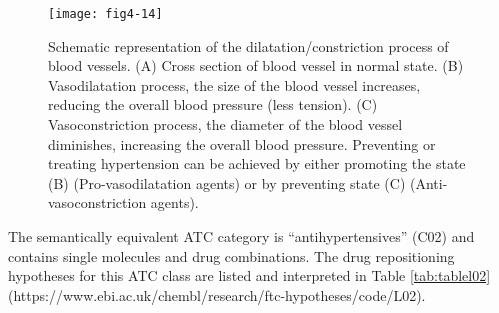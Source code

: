 \begin{figure}[ht]
    \centering
    \texttt{[image: fig4-14]}
    \caption{Schematic representation of the dilatation/constriction process of blood vessels. (A) Cross section of blood vessel in normal state. (B) Vasodilatation process, the size of the blood vessel increases, reducing the overall blood pressure (less tension). (C) Vasoconstriction process, the diameter of the blood vessel diminishes, increasing the overall blood pressure. Preventing or treating hypertension can be achieved by either promoting the state (B) (Pro-vasodilatation agents) or by preventing state (C) (Anti-vasoconstriction agents).}
    \label{fig4-14}
\end{figure}

The semantically equivalent ATC category is “antihypertensives” (C02) and contains single molecules and drug combinations. The drug repositioning hypotheses for this ATC class are listed and interpreted in Table \ref{tab:tablel02} (https://www.ebi.ac.uk/chembl/research/ftc-hypotheses/code/L02).

